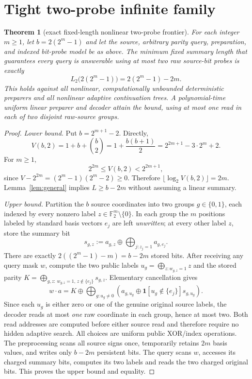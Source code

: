 \documentclass[10pt]{article}
\newtheorem{theorem}{Theorem}
\newcommand{\F}{\mathbb F_2}
\begin{document}
\section{Tight two-probe infinite family}
\begin{theorem}[exact fixed-length nonlinear two-probe frontier]\label{th:tight}
For each integer $m\ge1$, let $b=2(2^m-1)$ and let the source, arbitrary parity query, preparation, and indexed bit-probe model be as above. The minimum fixed summary length that guarantees every query is answerable using at most \emph{two} raw source-bit probes is exactly
\begin{equation}\label{eq:exact}
\boxed{L_2\bigl(2(2^m-1)\bigr)=2(2^m-1)-2m.}
\end{equation}
This holds against all nonlinear, computationally unbounded deterministic preparers and all nonlinear adaptive continuation trees. A polynomial-time \emph{uniform} linear preparer and decoder attain the bound, using at most one read in each of two disjoint raw-source groups.
\end{theorem}
\begin{proof}
\emph{Lower bound.} Put $b=2^{m+1}-2$. Directly,
\[
 V(b,2)=1+b+\binom b2=1+\frac{b(b+1)}2
 =2^{2m+1}-3\cdot2^m+2.
\]
For $m\ge1$,
\[
2^{2m}\le V(b,2)<2^{2m+1},
\]
since $V-2^{2m}=(2^m-1)(2^m-2)\ge0$. Therefore $\lfloor\log_2 V(b,2)\rfloor=2m$. Lemma~\ref{lem:general} implies $L\ge b-2m$ without assuming a linear summary.

\emph{Upper bound.} Partition the $b$ source coordinates into two groups $g\in\{0,1\}$, each indexed by every nonzero label $z\in\F^m\setminus\{0\}$. In each group the $m$ positions labeled by standard basis vectors $e_j$ are left \emph{unwritten}; at every other label $z$, store the summary bit
\[
 s_{g,z}:=a_{g,z}\oplus\bigoplus_{j:z_j=1}a_{g,e_j}.
\]
There are exactly $2((2^m-1)-m)=b-2m$ stored bits. After receiving any query mask $w$, compute the two public labels $u_g=\bigoplus_{z:w_{g,z}=1}z$ and the stored parity $K=\bigoplus_{g,z:\,w_{g,z}=1,\,z\notin\{e_j\}}s_{g,z}$. Elementary cancellation gives
\[
 w\cdot a =K\oplus\bigoplus_{g:u_g\ne0}
 \left(a_{g,u_g}\oplus \mathbf1[u_g\notin\{e_j\}]s_{g,u_g}\right).
\]
Since each $u_g$ is either zero or one of the genuine original source labels, the decoder reads at most \emph{one} raw coordinate in each group, hence at most two. Both read addresses are computed before either source read and therefore require no hidden adaptive search. All choices are uniform public XOR/index operations. The preprocessing scans all source signs once, temporarily retains $2m$ basis values, and writes only $b-2m$ persistent bits. The query scans $w$, accesses its charged summary bits, computes its two labels and reads the two charged original bits. This proves the upper bound and equality.
\end{proof}
\end{document}
